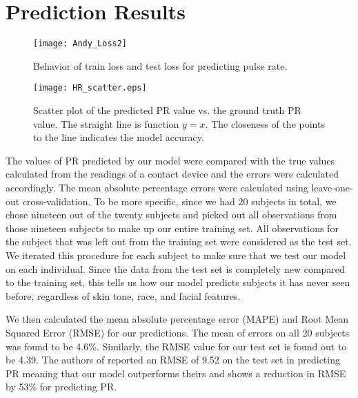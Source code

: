 \section{Prediction Results}\label{result}

\begin{figure}[htbp]
	\centering
		\vspace{-.2in}
	\texttt{[image: Andy\_Loss2]}
		\vspace{-.4in}
	\caption{Behavior of train loss and test loss for predicting pulse rate.}
	\label{fig:HR_loss}
		\vspace{-.2in}
\end{figure}

\begin{figure}[htbp]
	\centering
		\vspace{-.2in}
	\texttt{[image: HR\_scatter.eps]}
		\vspace{-.3in}
	\caption{Scatter plot of the predicted PR value vs. the ground truth PR value. The straight line is function \(y=x\). The closeness of the points to the line indicates the model accuracy. }
	\label{fig:scatter}
	\vspace{-.2in}
\end{figure}




%

The values of PR predicted by our model were compared with the true values calculated from the readings of a contact device and the errors were calculated accordingly. The mean absolute percentage errors were calculated using leave-one-out cross-validation. To be more specific, since we had 20 subjects in total, we chose nineteen out of the twenty subjects and picked out all observations from those nineteen subjects to make up our entire training set. All observations for the subject that was left out from the training set were considered as the test set. We iterated this procedure for each subject to make sure that we test our model on each individual. Since the data from the test set is completely new compared to the training set, this tells us how our model predicts subjects it has never seen before, regardless of skin tone, race, and facial features.


We then calculated the mean absolute percentage error (MAPE) and Root Mean Squared Error (RMSE) for our predictions. The mean of errors on all 20 subjects was found to be 4.6\%. Similarly, the RMSE value for our test set is found out to be 4.39.  The authors of \cite{osman2015supervised} reported an RMSE of 9.52 on the test set in predicting PR meaning that our model outperforms theirs and shows a reduction in RMSE by 53\% for predicting PR.
%








